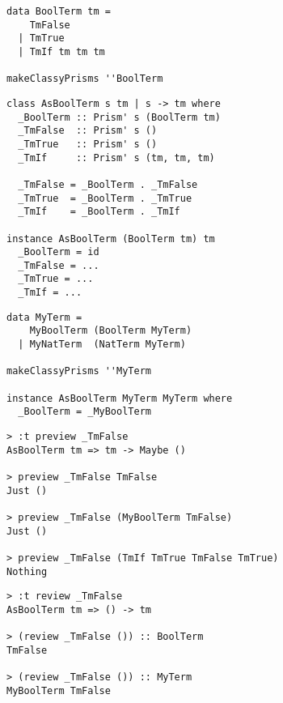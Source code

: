 \documentclass[aspectration=169]{beamer}
\begin{document}
\begin{frame}[fragile]
  \begin{verbatim}
data BoolTerm tm =
    TmFalse
  | TmTrue
  | TmIf tm tm tm

makeClassyPrisms ''BoolTerm
  \end{verbatim}
\end{frame} 

\begin{frame}[fragile]
  \begin{verbatim}
class AsBoolTerm s tm | s -> tm where
  _BoolTerm :: Prism' s (BoolTerm tm)
  _TmFalse  :: Prism' s ()
  _TmTrue   :: Prism' s ()
  _TmIf     :: Prism' s (tm, tm, tm)

  _TmFalse = _BoolTerm . _TmFalse
  _TmTrue  = _BoolTerm . _TmTrue
  _TmIf    = _BoolTerm . _TmIf

instance AsBoolTerm (BoolTerm tm) tm
  _BoolTerm = id
  _TmFalse = ...
  _TmTrue = ...
  _TmIf = ...
  \end{verbatim}
\end{frame} 

\begin{frame}[fragile]
  \begin{verbatim}
data MyTerm =
    MyBoolTerm (BoolTerm MyTerm)
  | MyNatTerm  (NatTerm MyTerm)

makeClassyPrisms ''MyTerm

instance AsBoolTerm MyTerm MyTerm where
  _BoolTerm = _MyBoolTerm
  \end{verbatim}
\end{frame} 

\begin{frame}[fragile]
  \begin{verbatim}
> :t preview _TmFalse
AsBoolTerm tm => tm -> Maybe ()

> preview _TmFalse TmFalse
Just ()

> preview _TmFalse (MyBoolTerm TmFalse)
Just ()

> preview _TmFalse (TmIf TmTrue TmFalse TmTrue)
Nothing
  \end{verbatim}
\end{frame} 

\begin{frame}[fragile]
  \begin{verbatim}
> :t review _TmFalse
AsBoolTerm tm => () -> tm

> (review _TmFalse ()) :: BoolTerm
TmFalse

> (review _TmFalse ()) :: MyTerm
MyBoolTerm TmFalse
  \end{verbatim}
\end{frame} 
\end{document}
